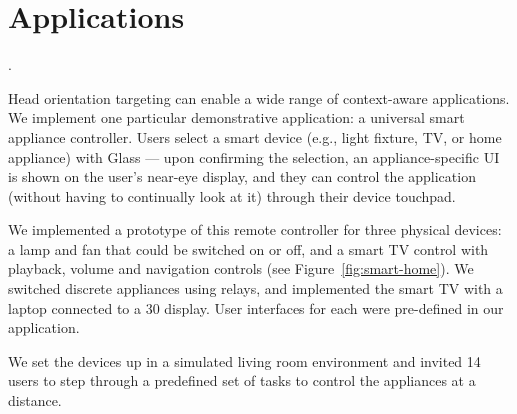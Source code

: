 \section{Applications}
\label{sec:applications}

.

Head orientation targeting can enable a wide range of context-aware applications. We implement one particular demonstrative application: a universal smart appliance controller. Users select a smart device (e.g., light fixture, TV, or home appliance) with Glass --- upon confirming the selection, an appliance-specific UI is shown on the user's near-eye display, and they can control the application (without having to continually look at it) through their device touchpad.

We implemented a prototype of this remote controller for three physical devices: a lamp and fan that could be switched on or off, and a smart TV control with playback, volume and navigation controls (see Figure~\ref{fig:smart-home}). We switched discrete appliances using relays, and implemented the smart TV with a laptop connected to a 30\inch{} display. User interfaces for each were pre-defined in our application. 

We set the devices up in a simulated living room environment and invited 14 users to step through a predefined set of tasks to control the appliances at a distance. 



